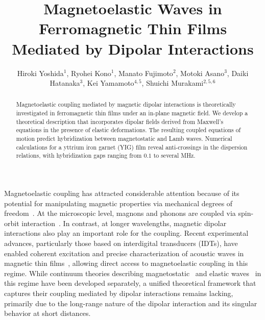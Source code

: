 \documentclass[10pt]{iopart}
\begin{document}
\title{Magnetoelastic Waves in Ferromagnetic Thin Films Mediated by Dipolar Interactions}

\author{Hiroki Yoshida$^1$, Ryohei Kono$^1$, Manato Fujimoto$^2$, Motoki Asano$^3$, Daiki Hatanaka$^3$, Kei Yamamoto$^{4,5}$, Shuichi Murakami$^{2,5,6}$}
\address{$^1$ Department of Physics, Institute of Science Tokyo, 2-12-1 Ookayama, Meguro-ku, Tokyo 152-8551, Japan}
\address{$^2$ Department of Applied Physics, The University of Tokyo, 7-3-1 Hongo, Bunkyo-ku, Tokyo 113-8656, Japan}
\address{$^3$ Basic Research Laboratories, NTT, Inc., 3-1 Morinosato-Wakamiya, Atsugi-shi, Kanagawa 243-0198, Japan}
\address{$^4$ Advanced Science Research Center, Japan Atomic Energy Agency, Tokai, Ibaraki 319-1195, Japan}
\address{$^5$ Center for Emergent Matter Science, RIKEN, 2-1 Hirosawa, Wako, Saitama 351-0198, Japan}
\address{$^6$ International Institute for Sustainability with Knotted Chiral Meta Matter (WPI-SKCM$^2$), Hiroshima University, Higashi-hiroshima, Hiroshima 739-0046, Japan}


\begin{abstract}
    Magnetoelastic coupling mediated by magnetic dipolar interactions is theoretically investigated in ferromagnetic thin films under an in-plane magnetic field. We develop a theoretical description that incorporates dipolar fields derived from Maxwell's equations in the presence of elastic deformations. The resulting coupled equations of motion predict hybridization between magnetostatic and Lamb waves. Numerical calculations for a yttrium iron garnet (YIG) film reveal anti-crossings in the dispersion relations, with hybridization gaps ranging from $0.1$ to several MHz.
\end{abstract}

\submitto{\APEX}
\maketitle
\ioptwocol

Magnetoelastic coupling has attracted considerable attention because of its potential for manipulating magnetic properties via mechanical degrees of freedom~\cite{Kittel_PR,LL_EDinCM}. At the microscopic level, magnons and phonons are coupled via spin-orbit interaction~\cite{Kittel_PR,Kittel_Abraham_RMP,Flebus_magnonPolaron}. In contrast, at longer wavelengths, magnetic dipolar interactions also play an important role for the coupling. Recent experimental advances, particularly those based on interdigital transducers (IDTs), have enabled coherent excitation and precise characterization of acoustic waves in magnetic thin films~\cite{IDT_review,Kunstle2025}, allowing direct access to magnetoelastic coupling in this regime. While continuum theories describing magnetostatic~\cite{Walker1957,damoneshbachMagnetostaticModesFerromagnet1961,damonPropagationMagnetostaticSpin} and elastic waves~\cite{Rayleigh1885,Rayleigh1889,Lamb1889,lambWavesElasticPlate1917} in this regime have been developed separately, a unified theoretical framework that captures their coupling mediated by dipolar interactions remains lacking, primarily due to the long-range nature of the dipolar interaction and its singular behavior at short distances.
\end{document}
